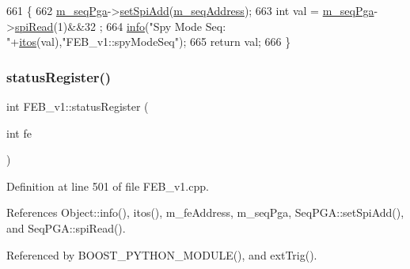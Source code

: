 \begin{DoxyCode}
661                         \{
662   \hyperlink{classFEB__v1_a6c7804ac86796f233a8393043adf2e77}{m\_seqPga}->\hyperlink{classSeqPGA_ac998ce3a6d9b5f2e88cc8393f8c1df53}{setSpiAdd}(\hyperlink{classFEB__v1_a1c1eb093fd1733b9510fcf8bc5c7ad08}{m\_seqAddress});
663   \textcolor{keywordtype}{int} val = \hyperlink{classFEB__v1_a6c7804ac86796f233a8393043adf2e77}{m\_seqPga}->\hyperlink{classSeqPGA_ab3d0e5e5d4014bc7a92588a76b8713d4}{spiRead}(1)&&32 ;
664   \hyperlink{classObject_a644fd329ea4cb85f54fa6846484b84a8}{info}(\textcolor{stringliteral}{"Spy Mode Seq: "}+\hyperlink{Tools_8h_af330027dbdafb9a30768b3613c553e60}{itos}(val),\textcolor{stringliteral}{"FEB\_v1::spyModeSeq"});
665   \textcolor{keywordflow}{return} val;
666 \}
\end{DoxyCode}
\mbox{\label{classFEB__v1_aa98b8e0bcc4d6d03f4b365de786f5c95}} 
\subsubsection{\texorpdfstring{status\+Register()}{statusRegister()}}
{\footnotesize\ttfamily int F\+E\+B\+\_\+v1\+::status\+Register (\begin{DoxyParamCaption}\item[{int}]{fe }\end{DoxyParamCaption})}



Definition at line 501 of file F\+E\+B\+\_\+v1.\+cpp.



References Object\+::info(), itos(), m\+\_\+fe\+Address, m\+\_\+seq\+Pga, Seq\+P\+G\+A\+::set\+Spi\+Add(), and Seq\+P\+G\+A\+::spi\+Read().



Referenced by B\+O\+O\+S\+T\+\_\+\+P\+Y\+T\+H\+O\+N\+\_\+\+M\+O\+D\+U\+L\+E(), and ext\+Trig().


